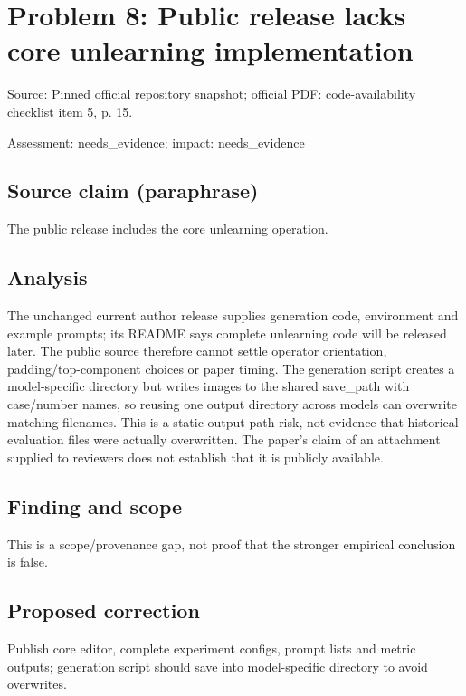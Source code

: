 \documentclass[11pt]{article}
\begin{document}
\section*{Problem 8: Public release lacks core unlearning implementation}

Source: Pinned official repository snapshot; official PDF: code-availability checklist item 5, p. 15.

Assessment: needs\_evidence; impact: needs\_evidence

\subsection*{Source claim (paraphrase)}

The public release includes the core unlearning operation.

\subsection*{Analysis}

The unchanged current author release supplies generation code, environment and example prompts; its README says complete unlearning code will be released later. The public source therefore cannot settle operator orientation, padding/top-component choices or paper timing. The generation script creates a model-specific directory but writes images to the shared save\_path with case/number names, so reusing one output directory across models can overwrite matching filenames. This is a static output-path risk, not evidence that historical evaluation files were actually overwritten. The paper’s claim of an attachment supplied to reviewers does not establish that it is publicly available.

\subsection*{Finding and scope}

This is a scope/provenance gap, not proof that the stronger empirical conclusion is false.

\subsection*{Proposed correction}

Publish core editor, complete experiment configs, prompt lists and metric outputs; generation script should save into model-specific directory to avoid overwrites.
\end{document}
